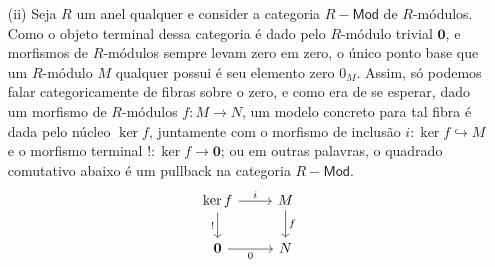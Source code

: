 \begin{exem}
\begin{enumerate}
  \item[(ii)] Seja $R$ um anel qualquer e consider a categoria $R-\mathsf{Mod}$ de $R$-módulos.
    Como o objeto terminal dessa categoria é dado pelo $R$-módulo trivial $\mathbf{0}$, e morfismos de $R$-módulos sempre levam zero em zero, o único ponto base que um $R$-módulo $M$ qualquer possui é seu elemento zero $0_{M}$.
    Assim, só podemos falar categoricamente de fibras sobre o zero, e como era de se esperar, dado um morfismo de $R$-módulos $f: M \to N$, um modelo concreto para tal fibra é dada pelo núcleo $\ker f$, juntamente com o morfismo de inclusão $i: \ker f \hookrightarrow M$ e o morfismo terminal $!: \ker f \to \mathbf{0}$; ou em outras palavras, o quadrado comutativo abaixo é um pullback na categoria $R-\mathsf{Mod}$.
    \begin{displaymath}
      \begin{tikzcd}
        \ker f
        \arrow[r, "i"]
        \arrow[d, "!" swap]
        & M
        \arrow[d, "f"]
        \\ \mathbf{0}
        \arrow[r, "0" swap]
        & N
      \end{tikzcd}
    \end{displaymath}
  \end{enumerate}
\end{exem}



